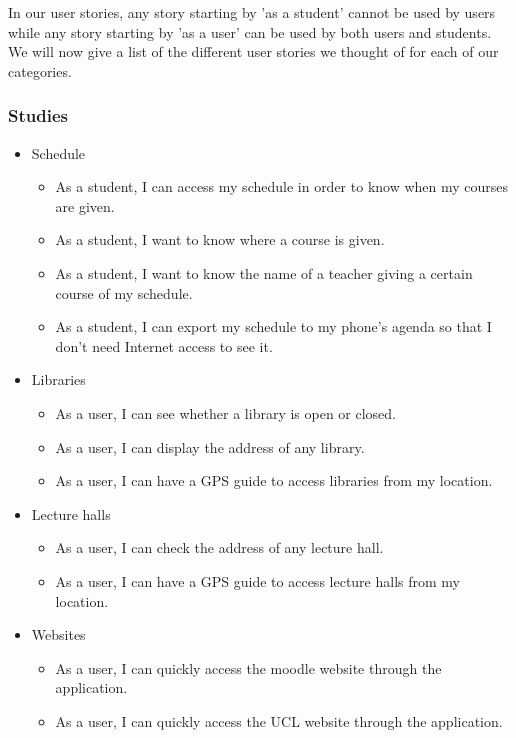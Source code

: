 \documentclass{eplmastersthesis}
\begin{document}
In our user stories, any story starting by 'as a student' cannot be used by users while any story starting by 'as a user' can be used by both users and students.\\

We will now give a list of the different user stories we thought of for each of our categories.

\subsubsection{Studies}

\begin{itemize}

\item Schedule
\begin{itemize}
\item As a student, I can access my schedule in order to know when my courses are given.
\item As a student, I want to know where a course is given.
\item As a student, I want to know the name of a teacher giving a certain course of my schedule.
\item As a student, I can export my schedule to my phone's agenda so that I don't need Internet access to see it.
\end{itemize}

\item Libraries
\begin{itemize}
\item As a user, I can see whether a library is open or closed.
\item As a user, I can display the address of any library.
\item As a user, I can have a GPS guide to access libraries from my location.
\end{itemize}

\item Lecture halls
\begin{itemize}
\item As a user, I can check the address of any lecture hall.
\item As a user, I can have a GPS guide to access lecture halls from my location.
\end{itemize}

\item Websites
\begin{itemize}
\item As a user, I can quickly access the moodle website through the application.
\item As a user, I can quickly access the UCL website through the application.
\end{itemize}

\end{itemize}
\end{document}
